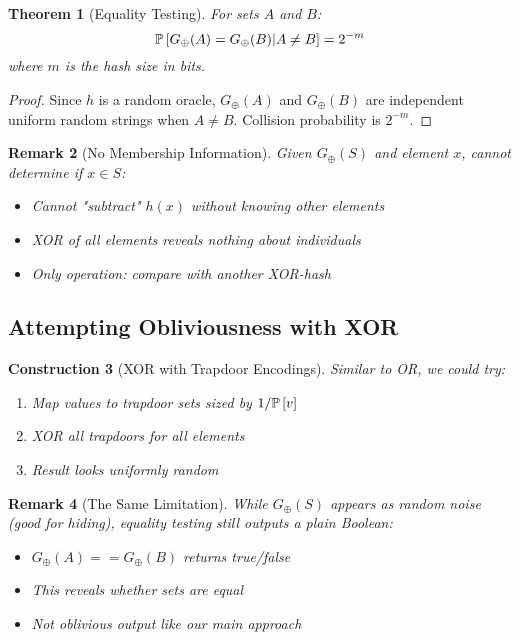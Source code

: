 \documentclass[11pt,final]{article}
\newcommand{\XOR}{\oplus}
\newtheorem{theorem}{Theorem}[section]
\newtheorem{remark}[theorem]{Remark}
\newtheorem{construction}[theorem]{Construction}
\begin{document}
\begin{theorem}[Equality Testing]
For sets $A$ and $B$:
\begin{equation}
\Prob{G_{\XOR}(A) = G_{\XOR}(B) | A \neq B} = 2^{-m}
\end{equation}
where $m$ is the hash size in bits.
\end{theorem}

\begin{proof}
Since $h$ is a random oracle, $G_{\XOR}(A)$ and $G_{\XOR}(B)$ are independent uniform random strings when $A \neq B$. Collision probability is $2^{-m}$.
\end{proof}

\begin{remark}[No Membership Information]
Given $G_{\XOR}(S)$ and element $x$, cannot determine if $x \in S$:
\begin{itemize}
    \item Cannot "subtract" $h(x)$ without knowing other elements
    \item XOR of all elements reveals nothing about individuals
    \item Only operation: compare with another XOR-hash
\end{itemize}
\end{remark}

\subsection{Attempting Obliviousness with XOR}

\begin{construction}[XOR with Trapdoor Encodings]
Similar to OR, we could try:
\begin{enumerate}
    \item Map values to trapdoor sets sized by $1/\mathbb{P}\left[v\right]$
    \item XOR all trapdoors for all elements
    \item Result looks uniformly random
\end{enumerate}
\end{construction}

\begin{remark}[The Same Limitation]
While $G_{\XOR}(S)$ appears as random noise (good for hiding), equality testing still outputs a plain Boolean:
\begin{itemize}
    \item $G_{\XOR}(A) == G_{\XOR}(B)$ returns true/false
    \item This reveals whether sets are equal
    \item Not oblivious output like our main approach
\end{itemize}
\end{remark}
\end{document}

